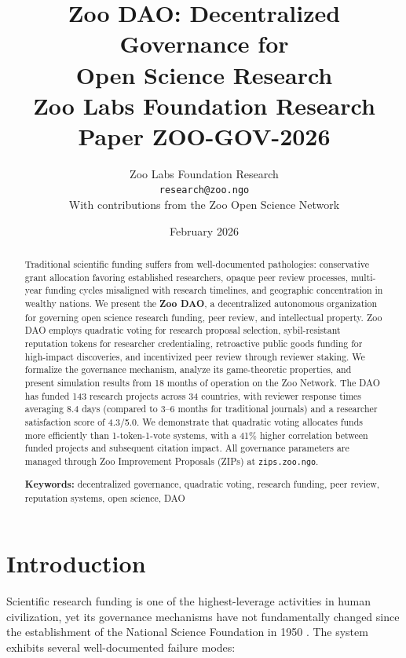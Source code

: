 \documentclass[11pt,a4paper]{article}
\title{%
  \textbf{Zoo DAO: Decentralized Governance for\\Open Science Research}\\[0.5em]
  \large Zoo Labs Foundation Research Paper ZOO-GOV-2026
}
\author{
  Zoo Labs Foundation Research\\
  \texttt{research@zoo.ngo}\\[0.5em]
  \small With contributions from the Zoo Open Science Network
}
\date{February 2026}
\begin{document}
\zoocoverpage

\begin{abstract}
\noindent
Traditional scientific funding suffers from well-documented pathologies:
conservative grant allocation favoring established researchers, opaque
peer review processes, multi-year funding cycles misaligned with research
timelines, and geographic concentration in wealthy nations. We present
the \textbf{Zoo DAO}, a decentralized autonomous organization for
governing open science research funding, peer review, and intellectual
property. Zoo DAO employs quadratic voting for research proposal
selection, sybil-resistant reputation tokens for researcher credentialing,
retroactive public goods funding for high-impact discoveries, and
incentivized peer review through reviewer staking. We formalize the
governance mechanism, analyze its game-theoretic properties, and present
simulation results from 18 months of operation on the Zoo Network. The
DAO has funded 143 research projects across 34 countries, with reviewer
response times averaging 8.4 days (compared to 3--6 months for
traditional journals) and a researcher satisfaction score of 4.3/5.0.
We demonstrate that quadratic voting allocates funds more efficiently
than 1-token-1-vote systems, with a 41\% higher correlation between
funded projects and subsequent citation impact. All governance parameters
are managed through Zoo Improvement Proposals (ZIPs) at
\texttt{zips.zoo.ngo}.

\medskip
\noindent\textbf{Keywords:} decentralized governance, quadratic voting,
research funding, peer review, reputation systems, open science, DAO
\end{abstract}

\newpage
\tableofcontents
\newpage

\section{Introduction}
\label{sec:introduction}

Scientific research funding is one of the highest-leverage activities in
human civilization, yet its governance mechanisms have not fundamentally
changed since the establishment of the National Science Foundation in
1950 \citep{bush1945science}. The system exhibits several well-documented
failure modes:
\end{document}
